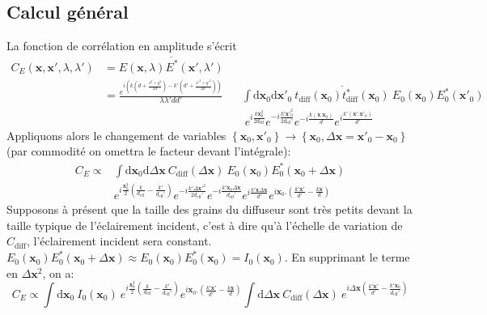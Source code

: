 \subsection{Calcul général}
La fonction de corrélation en amplitude s'écrit
\begin{align}
C_E(\mathbf{x},\mathbf{x}',\lambda,\lambda')&=\overline{E(\mathbf{x},\lambda) E^*(\mathbf{x}',\lambda')} \\
\nonumber &=\frac{e^{i \left( k (d+ \frac{x^2+y^2}{2d})-k'(d'+\frac{x'^2+y'^2}{2d'}) \right)}}{\lambda \lambda' d d'} 
&& \int{ \mathrm{d}\mathbf{x}_0 \mathrm{d}\mathbf{x}'_0 \: \overline{t_{\mathrm{diff}}(\mathbf{x}_0) t^*_{\mathrm{diff}}(\mathbf{x}_0)} \: E_0(\mathbf{x}_0) E^*_0(\mathbf{x}'_0)} \\ 
& && \; e^{i\frac{k \mathbf{x}^2_0}{2d_{\mathrm{eff}}}} e^{-i\frac{k' \mathbf{x}'^2_0}{2d_{\mathrm{eff}}'}} e^{-i\frac{k(\mathbf{x}.\mathbf{x}_0)}{d}} e^{i\frac{k'(\mathbf{x}'.\mathbf{x}'_0)}{d'}}
\end{align}
Appliquons alors le changement de variables $\left\lbrace \mathbf{x}_0, \mathbf{x}'_0\right\rbrace \rightarrow \left\lbrace \mathbf{x}_0, \Delta\mathbf{x}= \mathbf{x}'_0-\mathbf{x}_0\right\rbrace$ (par commodité on omettra le facteur devant l'intégrale):
\begin{align}
  C_E \propto &\int{\mathrm{d}\mathbf{x}_0 \mathrm{d}\Delta\mathbf{x} \: C_{\mathrm{diff}}(\Delta\mathbf{x}) \: E_0(\mathbf{x}_0)E^*_0(\mathbf{x}_0+\Delta\mathbf{x})} \\ 
  \nonumber & e^{i \frac{\mathbf{x}^2_0}{2}(\frac{k}{d_{\mathrm{eff}}}-\frac{k'}{d_{\mathrm{eff}}'})} e^{-i\frac{k'\Delta\mathbf{x}'^2}{2d_{\mathrm{eff}}'}} e^{-i\frac{k'\mathbf{x}_0 \Delta\mathbf{x}}{d_{\mathrm{eff}}'}} e^{i\frac{k'\mathbf{x} \Delta\mathbf{x}}{d'}} e^{i \mathbf{x}_0.(\frac{k'\mathbf{x}'}{d'}-\frac{k\mathbf{x}}{d})}
\end{align}
Supposons à présent que la taille des grains du diffuseur sont très petits devant la taille typique de l'éclairement incident, c'est à dire qu'à l'échelle de variation de $C_{\mathrm{diff}}$, l'éclairement incident sera constant. $E_0(\mathbf{x}_0)E^*_0(\mathbf{x}_0+\Delta\mathbf{x}) \approx E_0(\mathbf{x}_0)E^*_0(\mathbf{x}_0)=I_0(\mathbf{x}_0)$. En supprimant le terme en $\Delta\mathbf{x}^2$, on a: 
\begin{equation}
C_E \propto \int{\mathrm{d}\mathbf{x}_0  \: I_0(\mathbf{x}_0) \: e^{i \frac{\mathbf{x}^2_0}{2}(\frac{k}{d_{\mathrm{eff}}}-\frac{k'}{d_{\mathrm{eff}}'})} e^{i \mathbf{x}_0.(\frac{k'\mathbf{x}'}{d'}-\frac{k\mathbf{x}}{d})} \int{\mathrm{d}\Delta\mathbf{x} \: C_{\mathrm{diff}}(\Delta\mathbf{x}) \: e^{i \Delta\mathbf{x} (\frac{k'\mathbf{x}'}{d'}-\frac{k'\mathbf{x}_0}{d_{\mathrm{eff}}'})}}}
\end{equation}

